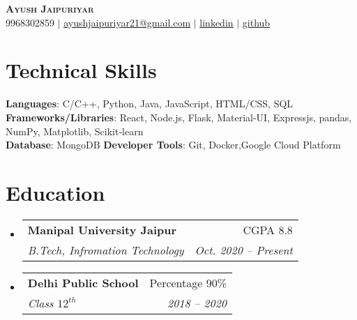 \documentclass[a4paper,11pt]{article}
\makeatletter
\newcommand{\resumeSubheading}[4]{
    \vspace{-2pt}\item
    \begin{tabular*}{0.97\textwidth}[t]{l@{\extracolsep{\fill}}r}
        \textbf{#1} & #2 \\
        \textit{\small#3} & \textit{\small #4} \\
    \end{tabular*}\vspace{-7pt}
}
\newcommand{\resumeSubHeadingListStart}{\begin{itemize}[leftmargin=0.15in, label={}]}
\newcommand{\resumeSubHeadingListEnd}{\end{itemize}}
\makeatother
\begin{document}

\begin{center}
    \textbf{\Huge \scshape Ayush Jaipuriyar} \\ \vspace{1pt}
    \small 9968302859 $|$ \href{mailto:ayushjaipuriyar21@gmail.com}{\underline{ayushjaipuriyar21@gmail.com}} $|$
    \href{https://linkedin.com/in/ayushjaipuriyar}{\underline{linkedin}} $|$
    \href{https://github.com/ayushjaipiuriyar}{\underline{github}}
\end{center}

%
\section{Technical Skills}
\begin{itemize}[leftmargin=0.15in, label={}]
    \small{\item{
                    \textbf{Languages}{: C/C++, Python, Java, JavaScript, HTML/CSS, SQL} \\
                    \textbf{Frameworks/Libraries}{: React, Node.js, Flask, Material-UI, Expressjs, pandas, NumPy, Matplotlib, Scikit‑learn} \\
                    \textbf{Database}{: MongoDB}
                    \textbf{Developer Tools}{: Git, Docker,Google Cloud Platform} \\
              }}
\end{itemize}

%

\section{Education}
\resumeSubHeadingListStart
\resumeSubheading
{Manipal University Jaipur}{CGPA 8.8}
{B.Tech, Infromation Technology}{Oct. 2020 -- Present}
\resumeSubheading
{Delhi Public School}{Percentage 90\%}
{Class $12^{th}$}{2018 -- 2020}
\resumeSubHeadingListEnd
\end{document}
